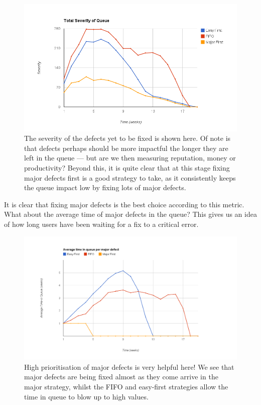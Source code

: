 \begin{figure}[ht!]
	\centering
	\includegraphics[scale=0.5]{graphs/QueueImpact.png}
	\caption{The severity of the defects yet to be fixed is shown here.
Of note is that defects perhaps should be more impactful the longer they are left in the queue ---
but are we then measuring reputation, money or productivity?
Beyond this, it is quite clear that at this stage fixing major defects first is a good strategy to
take, as it consistently keeps the queue impact low by fixing lots of major defects.} 
	\label{qimpact}
\end{figure}

It is clear that fixing major defects is the best choice according to this metric.
What about the average time of major defects in the queue?
This gives us an idea of how long users have been waiting for a fix to a critical error.

\begin{figure}[ht!]
	\centering
	\includegraphics[scale=0.45]{graphs/avgMajorQueueTime.png}
	\caption{High prioritisation of major defects is very helpful here!
	We see that major defects are being fixed almost as they come arrive in the major strategy, whilst
the FIFO and easy-first strategies allow the time in queue to blow up to high values.} 
	\label{avgmajqtime}
\end{figure}

